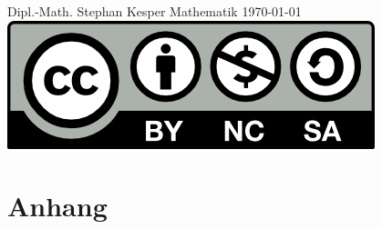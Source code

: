 \documentclass[]{memoir}
\begin{document}
\frontmatter

\thispagestyle{empty}
\begin{center}
{\Large Dipl.-Math. Stephan Kesper}
\vskip 4cm
{\fontsize{48}{52} \selectfont Mathematik}
\vskip 6cm
\today
\vfill
\includegraphics{../../../License/by-nc-sa.png}
\end{center}
\newpage




\tableofcontents

\newpage

\listoffigures

\mainmatter


















%
%













\appendix
\part{Anhang}





\backmatter





\printindex
\end{document}
